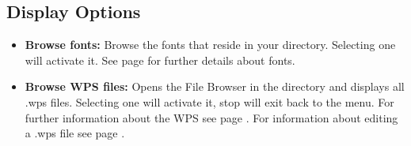   \subsection{\label{ref:Displayoptions}Display Options}
  
  \begin{itemize}
  \item \textbf{Browse fonts:  }
    Browse the fonts that reside in your  directory. Selecting one will activate it. See page \pageref{ref:Loadingfonts} for further details about fonts.
    
  \item \textbf{Browse WPS files:  }
    Opens the File Browser in the  directory and displays all .wps files. Selecting one will activate it, stop will exit back to the menu.  For further information about the WPS see page \pageref{ref:WPS}. For information about editing a .wps file see page \pageref{ref:ConfiguringtheWPS}.
    

\end{itemize}
